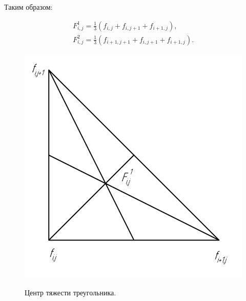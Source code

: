 \documentclass{article}
\begin{document}
Таким образом:

\begin{align} \label{eq:Ftriangle}
F^1_{i,j} = \frac{1}{3}(f_{i,j}+f_{i,j+1}+f_{i+1,j}), \\
F^2_{i,j} = \frac{1}{3}(f_{i+1,j+1}+f_{i,j+1}+f_{i+1,j}).
\end{align}

\begin{figure}[H]
\centering
\includegraphics[width=0.8\linewidth]{median_triangle.png}
\caption{}
\label{fig:mediantriangle}
Центр тяжести треугольника.
\end{figure}
\end{document}

